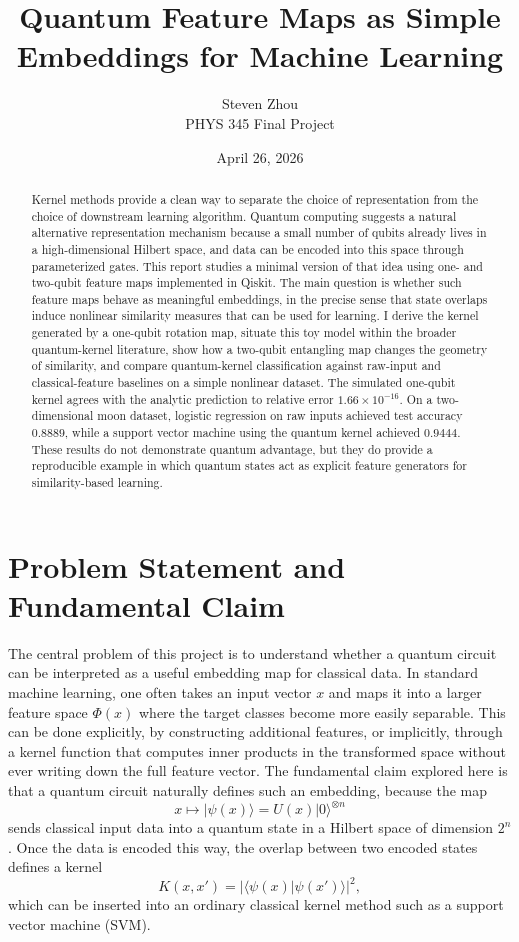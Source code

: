 \documentclass[11pt]{article}
\title{Quantum Feature Maps as Simple Embeddings for Machine Learning}
\author{Steven Zhou\\PHYS 345 Final Project}
\date{April 26, 2026}
\begin{document}
\maketitle

\begin{abstract}
Kernel methods provide a clean way to separate the choice of representation from the choice of downstream learning algorithm. Quantum computing suggests a natural alternative representation mechanism because a small number of qubits already lives in a high-dimensional Hilbert space, and data can be encoded into this space through parameterized gates. This report studies a minimal version of that idea using one- and two-qubit feature maps implemented in Qiskit. The main question is whether such feature maps behave as meaningful embeddings, in the precise sense that state overlaps induce nonlinear similarity measures that can be used for learning. I derive the kernel generated by a one-qubit rotation map, situate this toy model within the broader quantum-kernel literature, show how a two-qubit entangling map changes the geometry of similarity, and compare quantum-kernel classification against raw-input and classical-feature baselines on a simple nonlinear dataset. The simulated one-qubit kernel agrees with the analytic prediction to relative error $1.66\times 10^{-16}$. On a two-dimensional moon dataset, logistic regression on raw inputs achieved test accuracy $0.8889$, while a support vector machine using the quantum kernel achieved $0.9444$. These results do not demonstrate quantum advantage, but they do provide a reproducible example in which quantum states act as explicit feature generators for similarity-based learning.
\end{abstract}

\section{Problem Statement and Fundamental Claim}

The central problem of this project is to understand whether a quantum circuit can be interpreted as a useful embedding map for classical data. In standard machine learning, one often takes an input vector $x$ and maps it into a larger feature space $\Phi(x)$ where the target classes become more easily separable. This can be done explicitly, by constructing additional features, or implicitly, through a kernel function that computes inner products in the transformed space without ever writing down the full feature vector. The fundamental claim explored here is that a quantum circuit naturally defines such an embedding, because the map
\begin{equation}
x \mapsto |\psi(x)\rangle = U(x)|0\rangle^{\otimes n}
\label{eq:featuremap}
\end{equation}
sends classical input data into a quantum state in a Hilbert space of dimension $2^n$. Once the data is encoded this way, the overlap between two encoded states defines a kernel
\begin{equation}
K(x,x') = |\langle \psi(x) | \psi(x') \rangle|^2,
\label{eq:kerneldef}
\end{equation}
which can be inserted into an ordinary classical kernel method such as a support vector machine (SVM).
\end{document}
